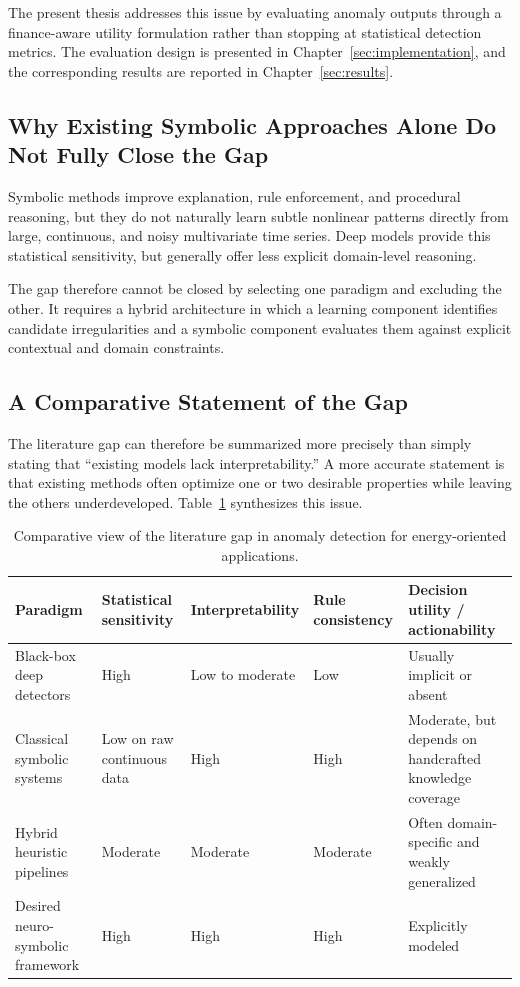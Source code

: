The present thesis addresses this issue by evaluating anomaly outputs through a
finance-aware utility formulation rather than stopping at statistical detection
metrics. The evaluation design is presented in Chapter~\ref{sec:implementation},
and the corresponding results are reported in Chapter~\ref{sec:results}.

\subsection{Why Existing Symbolic Approaches Alone Do Not Fully Close the Gap}

Symbolic methods improve explanation, rule enforcement, and procedural reasoning,
but they do not naturally learn subtle nonlinear patterns directly from large,
continuous, and noisy multivariate time series. Deep models provide this statistical
sensitivity, but generally offer less explicit domain-level reasoning.

The gap therefore cannot be closed by selecting one paradigm and excluding the
other. It requires a hybrid architecture in which a learning component identifies
candidate irregularities and a symbolic component evaluates them against explicit
contextual and domain constraints.

\subsection{A Comparative Statement of the Gap}

The literature gap can therefore be summarized more precisely than simply stating that ``existing models lack interpretability.'' A more accurate statement is that existing methods often optimize one or two desirable properties while leaving the others underdeveloped. Table~\ref{tab:gap_comparison} synthesizes this issue.

\begin{table}[H]
	\centering
	\caption{Comparative view of the literature gap in anomaly detection for energy-oriented applications.}
	\label{tab:gap_comparison}
	\small
	\begin{tabular}{|p{2.5cm}|p{2.8cm}|p{2.8cm}|p{2.6cm}|p{3.8cm}|}
		\hline
		\textbf{Paradigm} & \textbf{Statistical sensitivity} & \textbf{Interpretability} & \textbf{Rule consistency} & \textbf{Decision utility / actionability} \\
		\hline
		Black-box deep detectors & High & Low to moderate & Low & Usually implicit or absent \\
		\hline
		Classical symbolic systems & Low on raw continuous data & High & High & Moderate, but depends on handcrafted knowledge coverage \\
		\hline
		Hybrid heuristic pipelines & Moderate & Moderate & Moderate & Often domain-specific and weakly generalized \\
		\hline
		Desired neuro-symbolic framework & High & High & High & Explicitly modeled \\
		\hline
	\end{tabular}
\end{table}

